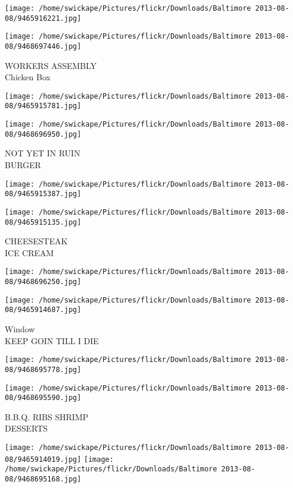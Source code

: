 \documentclass[10pt,letterpaper]{article}
\begin{document}
\texttt{[image: /home/swickape/Pictures/flickr/Downloads/Baltimore 2013-08-08/9465916221.jpg]}

\vspace{0.25in}
\texttt{[image: /home/swickape/Pictures/flickr/Downloads/Baltimore 2013-08-08/9468697446.jpg]}

WORKERS ASSEMBLY\\
Chicken Box
\pagebreak

\texttt{[image: /home/swickape/Pictures/flickr/Downloads/Baltimore 2013-08-08/9465915781.jpg]}

\vspace{0.25in}
\texttt{[image: /home/swickape/Pictures/flickr/Downloads/Baltimore 2013-08-08/9468696950.jpg]}

NOT YET IN RUIN\\
BURGER
\pagebreak

\texttt{[image: /home/swickape/Pictures/flickr/Downloads/Baltimore 2013-08-08/9465915387.jpg]}

\vspace{0.25in}
\texttt{[image: /home/swickape/Pictures/flickr/Downloads/Baltimore 2013-08-08/9465915135.jpg]}

CHEESESTEAK\\
ICE CREAM
\pagebreak

\texttt{[image: /home/swickape/Pictures/flickr/Downloads/Baltimore 2013-08-08/9468696250.jpg]}

\vspace{0.25in}
\texttt{[image: /home/swickape/Pictures/flickr/Downloads/Baltimore 2013-08-08/9465914687.jpg]}

Window\\
KEEP GOIN TILL I DIE
\pagebreak

\texttt{[image: /home/swickape/Pictures/flickr/Downloads/Baltimore 2013-08-08/9468695778.jpg]}

\vspace{0.25in}
\texttt{[image: /home/swickape/Pictures/flickr/Downloads/Baltimore 2013-08-08/9468695590.jpg]}

B.B.Q. RIBS SHRIMP\\
DESSERTS
\pagebreak

\texttt{[image: /home/swickape/Pictures/flickr/Downloads/Baltimore 2013-08-08/9465914019.jpg]}
\texttt{[image: /home/swickape/Pictures/flickr/Downloads/Baltimore 2013-08-08/9468695168.jpg]}
\end{document}
